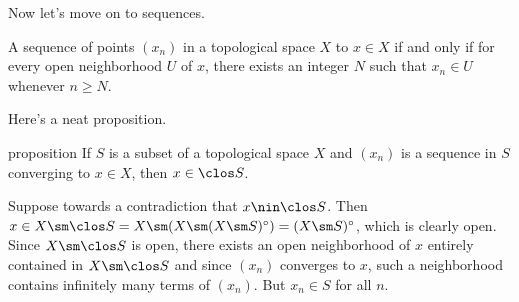 \documentclass[class=article, crop=false]{standalone}
\begin{document}
Now let's move on to sequences.

\begin{defn}
  A sequence of points $(x_n)$ in a topological space $X$  to $x \in X$ if and only if for every open neighborhood $U$ of $x$, there exists an integer $N$ such that $x_n \in U$ whenever $n \geq N$.
\end{defn}

Here's a neat proposition.

\begin{result}{proposition}
  If $S$ is a subset of a topological space $X$ and $(x_n)$ is a sequence in $S$ converging to $x \in X$, then $x \in \clos S$.
\end{result}
\begin{pf}
  Suppose towards a contradiction that $x \nin \clos S$. Then $x \in X \sm \clos S = X \sm (X \sm (X \sm S)^\circ) = (X \sm S)^\circ$, which is clearly open. Since $X \sm \clos S$ is open, there exists an open neighborhood of $x$ entirely contained in $X \sm \clos S$ and since $(x_n)$ converges to $x$, such a neighborhood contains infinitely many terms of $(x_n)$. But $x_n \in S$ for all $n$.
\end{pf}
\end{document}

